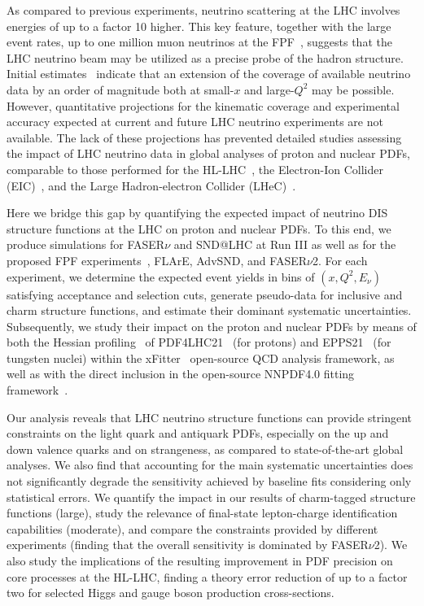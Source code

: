 As compared to  previous experiments,  neutrino
scattering at the LHC involves energies of up to a factor 10  higher.
%
This key feature, together with the large event rates,
up to one million muon neutrinos at the FPF~\cite{Kling:2021gos},
suggests that the LHC  neutrino beam may be utilized
as a precise probe of the hadron structure.
%
Initial estimates~\cite{Feng:2022inv} indicate that an extension of the coverage of
available neutrino data by an order of magnitude both at small-$x$
and large-$Q^2$ may be possible.
%
However, quantitative projections for the kinematic coverage
and experimental accuracy expected at current
and future LHC neutrino experiments are not available.
%
The lack of these projections has prevented detailed studies assessing the impact
of LHC neutrino data in global analyses of proton and nuclear PDFs, comparable to
those performed for the HL-LHC~\cite{AbdulKhalek:2018rok,Azzi:2019yne}, the Electron-Ion Collider (EIC)~\cite{AbdulKhalek:2021gbh,Khalek:2021ulf,AbdulKhalek:2019mzd}, and the
Large Hadron-electron Collider (LHeC)~\cite{AbdulKhalek:2019mps,LHeC:2020van,LHeCStudyGroup:2012zhm}. 

Here we bridge this gap by quantifying
the expected impact of  neutrino DIS structure functions at the LHC on proton and nuclear PDFs.
%
To this end, we produce simulations for  FASER$\nu$ and SND@LHC at Run III 
as well as for the proposed FPF experiments~\cite{Anchordoqui:2021ghd,Feng:2022inv,Batell:2021blf,Batell:2021aja}, FLArE, AdvSND, and FASER$\nu$2.
%
For each experiment, we determine the expected event yields in bins of $(x,Q^2,E_\nu)$
satisfying acceptance and selection cuts,
generate pseudo-data for  inclusive and charm 
structure functions, 
and estimate their dominant systematic uncertainties.
%
Subsequently, we study their impact on the proton and nuclear PDFs by means of both the Hessian profiling~\cite{Paukkunen:2014zia,  Schmidt:2018hvu, AbdulKhalek:2018rok, HERAFitterdevelopersTeam:2015cre}
of  PDF4LHC21~\cite{PDF4LHCWorkingGroup:2022cjn} (for protons) and EPPS21~\cite{Eskola:2021nhw}
(for tungsten nuclei)
within the {\sc\small xFitter}~\cite{Alekhin:2014irh, Bertone:2017tig, xFitter:2022zjb, xFitter:web} open-source QCD analysis framework,
as well as with the direct inclusion in the open-source NNPDF4.0 fitting framework~\cite{NNPDF:2021uiq}.

Our analysis reveals that  LHC neutrino structure functions can provide  stringent constraints
on the light quark and antiquark PDFs, especially on the up and down
valence quarks and on strangeness, as compared to state-of-the-art global analyses.
%
We also  find that accounting for the main systematic uncertainties does not significantly
degrade the sensitivity achieved by baseline fits considering only statistical errors.
%
We quantify the impact in our results of charm-tagged structure functions (large), study the relevance
of final-state lepton-charge identification capabilities (moderate), and compare the constraints
provided by different experiments (finding that the overall sensitivity is dominated by FASER$\nu$2).
%
We also study the implications of the resulting improvement in PDF precision
on core processes at the HL-LHC, finding a theory error reduction
of up to a factor two for selected  Higgs and gauge boson production
cross-sections. 

